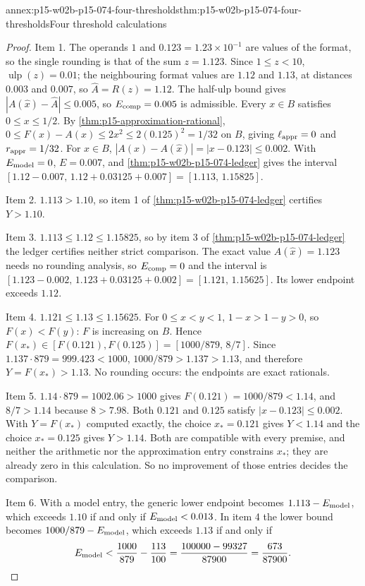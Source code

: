 \begin{annexitem}{annex:p15-w02b-p15-074-four-thresholds}{thm:p15-w02b-p15-074-four-thresholds}{Four threshold calculations}
\begin{proof}
Item 1. The operands \(1\) and \(0.123=1.23\times10^{-1}\) are values of
the format, so the single rounding is that of the sum
\(z=1.123\). Since \(1\leq z<10\), \(\operatorname{ulp}(z)=0.01\); the
neighbouring format values are \(1.12\) and \(1.13\), at distances
\(0.003\) and \(0.007\), so \(\widehat A=R(z)=1.12\). The half-ulp bound
gives \(|A(\widehat x)-\widehat A|\leq0.005\), so \(E_{\rm comp}=0.005\)
is admissible. Every \(x\in B\) satisfies \(0\leq x\leq1/2\). By
\cref{thm:p15-approximation-rational},
\(0\leq F(x)-A(x)\leq2x^2\leq2(0.125)^2=1/32\) on \(B\), giving
\(\ell_{\rm appr}=0\) and \(r_{\rm appr}=1/32\). For \(x\in B\),
\(|A(x)-A(\widehat x)|=|x-0.123|\leq0.002\). With \(E_{\rm model}=0\),
\(E=0.007\), and \cref{thm:p15-w02b-p15-074-ledger} gives the interval
\([1.12-0.007,\,1.12+0.03125+0.007]=[1.113,\,1.15825]\).

Item 2. \(1.113>1.10\), so item 1 of
\cref{thm:p15-w02b-p15-074-ledger} certifies \(Y>1.10\).

Item 3. \(1.113\leq1.12\leq1.15825\), so by item 3 of
\cref{thm:p15-w02b-p15-074-ledger} the ledger certifies neither strict
comparison. The exact value \(A(\widehat x)=1.123\) needs no rounding
analysis, so \(E_{\rm comp}=0\) and the interval is
\([1.123-0.002,\,1.123+0.03125+0.002]=[1.121,\,1.15625]\). Its lower
endpoint exceeds \(1.12\).

Item 4. \(1.121\leq1.13\leq1.15625\). For \(0\leq x<y<1\),
\(1-x>1-y>0\), so \(F(x)<F(y)\): \(F\) is increasing on \(B\). Hence
\(F(x_*)\in[F(0.121),F(0.125)]=[1000/879,\,8/7]\). Since
\(1.137\cdot879=999.423<1000\), \(1000/879>1.137>1.13\), and therefore
\(Y=F(x_*)>1.13\). No rounding occurs: the endpoints are exact rationals.

Item 5. \(1.14\cdot879=1002.06>1000\) gives \(F(0.121)=1000/879<1.14\),
and \(8/7>1.14\) because \(8>7.98\). Both \(0.121\) and \(0.125\) satisfy
\(|x-0.123|\leq0.002\). With \(Y=F(x_*)\) computed exactly, the choice
\(x_*=0.121\) gives \(Y<1.14\) and the choice \(x_*=0.125\) gives
\(Y>1.14\). Both are compatible with every premise, and neither the
arithmetic nor the approximation entry constrains \(x_*\); they are
already zero in this calculation. So no improvement of those entries
decides the comparison.

Item 6. With a model entry, the generic lower endpoint becomes
\(1.113-E_{\rm model}\), which exceeds \(1.10\) if and only if
\(E_{\rm model}<0.013\). In item 4 the lower bound becomes
\(1000/879-E_{\rm model}\), which exceeds \(1.13\) if and only if
\[
 E_{\rm model}<\frac{1000}{879}-\frac{113}{100}
 =\frac{100000-99327}{87900}=\frac{673}{87900}.
\]
\end{proof}
\end{annexitem}

